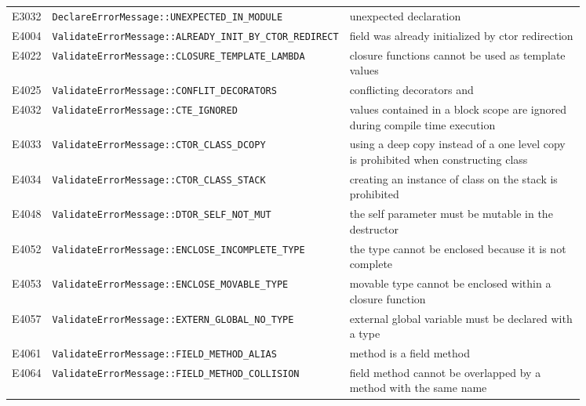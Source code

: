 \begin{longtable}{@{}l p{0.4\linewidth} p{0.45\linewidth}@{}}
E3032 & \texttt{DeclareErrorMessage::\allowbreak{}UNEXPECTED\_\allowbreak{}IN\_\allowbreak{}MODULE} & unexpected declaration\\
E4004 & \texttt{ValidateErrorMessage::\allowbreak{}ALREADY\_\allowbreak{}INIT\_\allowbreak{}BY\_\allowbreak{}CTOR\_\allowbreak{}REDIRECT} & field \errhole{} was already initialized by ctor redirection\\
E4022 & \texttt{ValidateErrorMessage::\allowbreak{}CLOSURE\_\allowbreak{}TEMPLATE\_\allowbreak{}LAMBDA} & closure functions cannot be used as template values\\
E4025 & \texttt{ValidateErrorMessage::\allowbreak{}CONFLIT\_\allowbreak{}DECORATORS} & conflicting decorators \errhole{} and \errhole{}\\
E4032 & \texttt{ValidateErrorMessage::\allowbreak{}CTE\_\allowbreak{}IGNORED} & \errhole{} values contained in a block scope are ignored during compile time execution\\
E4033 & \texttt{ValidateErrorMessage::\allowbreak{}CTOR\_\allowbreak{}CLASS\_\allowbreak{}DCOPY} & using a deep copy instead of a one level copy is prohibited when constructing class \errhole{}\\
E4034 & \texttt{ValidateErrorMessage::\allowbreak{}CTOR\_\allowbreak{}CLASS\_\allowbreak{}STACK} & creating an instance of class \errhole{} on the stack is prohibited\\
E4048 & \texttt{ValidateErrorMessage::\allowbreak{}DTOR\_\allowbreak{}SELF\_\allowbreak{}NOT\_\allowbreak{}MUT} & the self parameter must be mutable in the destructor\\
E4052 & \texttt{ValidateErrorMessage::\allowbreak{}ENCLOSE\_\allowbreak{}INCOMPLETE\_\allowbreak{}TYPE} & the type \errhole{} cannot be enclosed because it is not complete\\
E4053 & \texttt{ValidateErrorMessage::\allowbreak{}ENCLOSE\_\allowbreak{}MOVABLE\_\allowbreak{}TYPE} & movable type \errhole{} cannot be enclosed within a closure function\\
E4057 & \texttt{ValidateErrorMessage::\allowbreak{}EXTERN\_\allowbreak{}GLOBAL\_\allowbreak{}NO\_\allowbreak{}TYPE} & external global variable must be declared with a type\\
E4061 & \texttt{ValidateErrorMessage::\allowbreak{}FIELD\_\allowbreak{}METHOD\_\allowbreak{}ALIAS} & method \errhole{} is a field method\\
E4064 & \texttt{ValidateErrorMessage::\allowbreak{}FIELD\_\allowbreak{}METHOD\_\allowbreak{}COLLISION} & field method \errhole{} cannot be overlapped by a method with the same name \errhole{}\\

\end{longtable}
